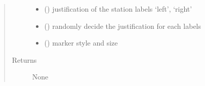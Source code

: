\documentclass[letterpaper,10pt,english]{sphinxmanual}
\begin{document}
\begin{fulllineitems}
\begin{quote}
\begin{description}
\begin{itemize}
\item {} 
\sphinxAtStartPar
{} () \textendash{} justification of the station labels \sphinxhyphen{} ‘left’, ‘right’

\item {} 
\sphinxAtStartPar
{} () \textendash{} randomly decide the justification for each labels

\item {} 
\sphinxAtStartPar
{} () \textendash{} marker style and size

\end{itemize}

\item[{Returns}] \leavevmode
\sphinxAtStartPar
None

\end{description}\end{quote}


\end{fulllineitems}
\end{document}
